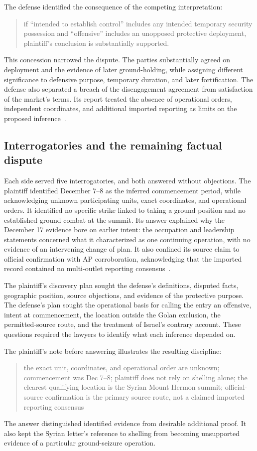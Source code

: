 \documentclass[11pt]{article}
\begin{document}
The defense identified the consequence of the competing interpretation:
\begin{quote}
if ``intended to establish control'' includes any intended temporary security possession and ``offensive'' includes an unopposed protective deployment, plaintiff's conclusion is substantially supported.
\end{quote}
This concession narrowed the dispute.  The parties substantially agreed on deployment and the evidence of later ground-holding, while assigning different significance to defensive purpose, temporary duration, and later fortification.  The defense also separated a breach of the disengagement agreement from satisfaction of the market's terms.  Its report treated the absence of operational orders, independent coordinates, and additional imported reporting as limits on the proposed inference~\cite[file 0007, sections 3--7]{record}.

\subsection{Interrogatories and the remaining factual dispute}

Each side served five interrogatories, and both answered without objections.  The plaintiff identified December 7--8 as the inferred commencement period, while acknowledging unknown participating units, exact coordinates, and operational orders.  It identified no specific strike linked to taking a ground position and no established ground combat at the summit.  Its answer explained why the December 17 evidence bore on earlier intent: the occupation and leadership statements concerned what it characterized as one continuing operation, with no evidence of an intervening change of plan.  It also confined its source claim to official confirmation with AP corroboration, acknowledging that the imported record contained no multi-outlet reporting consensus~\cite[events 24--26]{record}.

The plaintiff's discovery plan sought the defense's definitions, disputed facts, geographic position, source objections, and evidence of the protective purpose.  The defense's plan sought the operational basis for calling the entry an offensive, intent at commencement, the location outside the Golan exclusion, the permitted-source route, and the treatment of Israel's contrary account.  These questions required the lawyers to identify what each inference depended on.

The plaintiff's note before answering illustrates the resulting discipline:
\begin{quote}
the exact unit, coordinates, and operational order are unknown; commencement was Dec 7--8; plaintiff does not rely on shelling alone; the clearest qualifying location is the Syrian Mount Hermon summit; official-source confirmation is the primary source route, not a claimed imported reporting consensus
\end{quote}
The answer distinguished identified evidence from desirable additional proof.  It also kept the Syrian letter's reference to shelling from becoming unsupported evidence of a particular ground-seizure operation.
\end{document}
